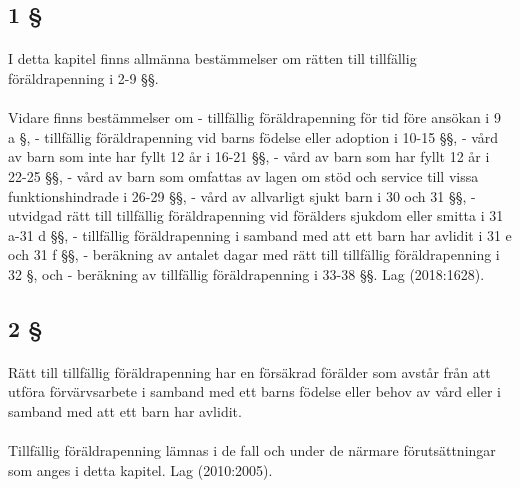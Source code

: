 \documentclass[a4paper,notitlepage,openany,10pt]{book}
\begin{document}
\subsection*{1 §}
\paragraph*{}
I detta kapitel finns allmänna bestämmelser om rätten till tillfällig föräldrapenning i 2-9 §§.
\paragraph*{}
Vidare finns bestämmelser om
\newline - tillfällig föräldrapenning för tid före ansökan i 9 a §,
\newline - tillfällig föräldrapenning vid barns födelse eller adoption i 10-15 §§,
\newline - vård av barn som inte har fyllt 12 år i 16-21 §§,
\newline - vård av barn som har fyllt 12 år i 22-25 §§,
\newline - vård av barn som omfattas av lagen om stöd och service till vissa funktionshindrade i 26-29 §§,
\newline - vård av allvarligt sjukt barn i 30 och 31 §§,
\newline - utvidgad rätt till tillfällig föräldrapenning vid förälders sjukdom eller smitta i 31 a-31 d §§,
\newline - tillfällig föräldrapenning i samband med att ett barn har avlidit i 31 e och 31 f §§,
\newline - beräkning av antalet dagar med rätt till tillfällig föräldrapenning i 32 §, och
\newline - beräkning av tillfällig föräldrapenning i 33-38 §§.
Lag (2018:1628).
\subsection*{2 §}
\paragraph*{}
Rätt till tillfällig föräldrapenning har en försäkrad förälder som avstår från att utföra förvärvsarbete i samband med ett barns födelse eller behov av vård eller i samband med att ett barn har avlidit.
\paragraph*{}
Tillfällig föräldrapenning lämnas i de fall och under de närmare förutsättningar som anges i detta kapitel.
Lag (2010:2005).
\end{document}
